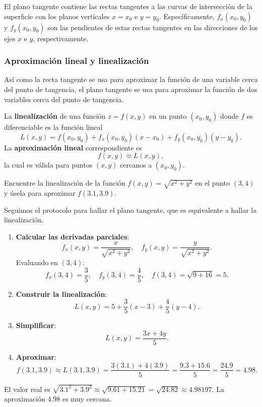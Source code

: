 \begin{rem}
El plano tangente contiene las rectas tangentes a las curvas de intersección de la superficie con los planos verticales $x = x_0$ e $y = y_0$. Específicamente, $f_x(x_0, y_0)$ y $f_y(x_0, y_0)$ son las pendientes de estas rectas tangentes en las direcciones de los ejes $x$ e $y$, respectivamente.
\end{rem}

\subsubsection{Aproximación lineal y linealización}

Así como la recta tangente se usa para aproximar la función de una variable cerca del punto de tangencia, el plano tangente se usa para aproximar la función de dos variables cerca del punto de tangencia.

\begin{definition}[Linealización]
La \textbf{linealización} de una función $z = f(x, y)$ en un punto $(x_0, y_0)$ donde $f$ es diferenciable es la función lineal
\[
L(x, y) = f(x_0, y_0) + f_x(x_0, y_0)(x - x_0) + f_y(x_0, y_0)(y - y_0).
\]
La \textbf{aproximación lineal} correspondiente es
\[
f(x, y) \approx L(x, y),
\]
la cual es válida para puntos $(x, y)$ cercanos a $(x_0, y_0)$.
\end{definition}

\begin{example}
Encuentre la linealización de la función $f(x, y) = \sqrt{x^2 + y^2}$ en el punto $(3, 4)$ y úsela para aproximar $f(3.1, 3.9)$.
\end{example}
\begin{myproof}
Seguimos el protocolo para hallar el plano tangente, que es equivalente a hallar la linealización.
\begin{enumerate}
    \item \textbf{Calcular las derivadas parciales}:
    \[
    f_x(x, y) = \frac{x}{\sqrt{x^2 + y^2}}, \quad f_y(x, y) = \frac{y}{\sqrt{x^2 + y^2}}.
    \]
    Evaluando en $(3, 4)$:
    \[
    f_x(3, 4) = \frac{3}{5}, \quad f_y(3, 4) = \frac{4}{5}, \quad f(3, 4) = \sqrt{9+16} = 5.
    \]

    \item \textbf{Construir la linealización}:
    \[
    L(x, y) = 5 + \frac{3}{5}(x - 3) + \frac{4}{5}(y - 4).
    \]

    \item \textbf{Simplificar}:
    \[
    L(x, y) = \frac{3x + 4y}{5}.
    \]
    \item \textbf{Aproximar}:
    \[
    f(3.1, 3.9) \approx L(3.1, 3.9) = \frac{3(3.1) + 4(3.9)}{5} = \frac{9.3 + 15.6}{5} = \frac{24.9}{5} = 4.98.
    \]
\end{enumerate}
El valor real es $\sqrt{3.1^2 + 3.9^2} \approx \sqrt{9.61 + 15.21} = \sqrt{24.82} \approx 4.98197$. La aproximación $\boxed{4.98}$ es muy cercana.
\end{myproof}

